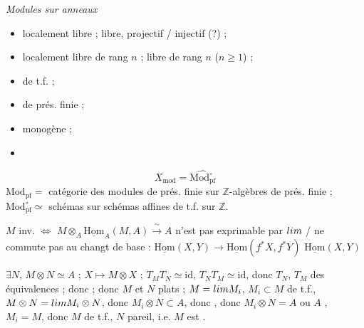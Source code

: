 \documentclass[11pt,a4paper]{article}
\begin{document}
\emph{Modules sur anneaux}
\begin{itemize}
  \item localement libre ; libre, projectif / injectif (?) ;
  \item localement libre de rang $n$ ; libre de rang $n$ ($n \geqslant 1$) ;
  \item de t.f. ;
  \item de prés. finie ;
  \item monogène ;
  \item \struck{\ill{}}
\end{itemize}



\[
  X_{\mathrm{mod}} = \widehat{\mathrm{Mod}^{\circ}_{\mathrm{pf}}}
\]
$\mathrm{Mod}_{\mathrm{pf}} =$ catégorie des modules de prés. finie sur
$\mathbb{Z}$-algèbres de prés. finie \ill{} ; $\mathrm{Mod}^{\circ}_{\mathrm{pf}}
\simeq$ schémas \struck{\ill{}} \ill{} \ill{} sur schémas affines de t.f. sur
$\mathbb{Z}$.

$M$ inv. $\Longleftrightarrow$ $M \otimes_{A} \underline{\mathrm{Hom}}_{A}(M,
A) \xrightarrow{\ \sim\ } A$ \ill{} n'est pas exprimable par $\varinjlim$ /
ne commute pas au changt de base \ill{} :
$\underline{\mathrm{Hom}}(X, Y) \to \underline{\mathrm{Hom}}(f^{*}X, f^{*}Y)$
\ill{} \struck{\ill{}} $\underline{\mathrm{Hom}}(X, Y)$ \ill{}

$\exists N$, $M \otimes N \simeq A$ ; $X \mapsto M \otimes X$ ; $T_{M} T_{N}
\simeq \mathrm{id}$, $T_{N} T_{M} \simeq \mathrm{id}$, donc $T_{N}$, $T_{M}$
des équivalences ; donc \ill{} ; donc $M$ et $N$ plats  ; $M =
\varinjlim M_{i}$, $M_{i} \subset M$ de t.f., $M \otimes N = \varinjlim M_{i}
\otimes N$, donc $M_{i} \otimes N \subset A$, donc \ill{} \ill{}, donc
$M_{i} \otimes N = A$ ou $A$ \ill{}, \ill{} $M_{i} = M$, donc $M$ de t.f.,
\struck{\ill{}} $N$ pareil, i.e. $M$ est \ill{}.
\struck{\ill{} \ill{}} 
\end{document}
